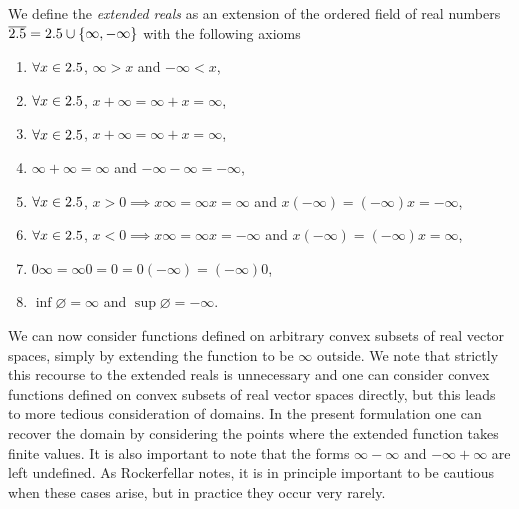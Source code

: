 \begin{defn}\label{defn:extended reals}
  We define the \emph{extended reals} as an extension of the ordered field of real numbers $\overline{2.5} = 2.5 \cup \{\infty, -\infty\}$ with the following axioms
  \begin{enumerate}
    \item $\forall x\in2.5$, $\infty > x$ and $-\infty < x$,
    \item $\forall x\in2.5$, $x + \infty = \infty + x = \infty$,
    \item $\forall x\in2.5$, $x + \infty = \infty + x = \infty$,
    \item $\infty + \infty = \infty$ and $-\infty - \infty = -\infty$,
    \item $\forall x\in2.5$, $x>0 \implies x\infty = \infty x =  \infty$ and $x(-\infty) = (-\infty)x = -\infty$,
    \item $\forall x\in2.5$, $x<0 \implies x\infty = \infty x = -\infty$ and $x(-\infty) = (-\infty)x = \infty$,
    \item $0 \infty = \infty 0 = 0 = 0(-\infty) = (-\infty)0$,
    \item $\inf\varnothing = \infty$ and $\sup\varnothing = -\infty$.
  \end{enumerate}
\end{defn}
We can now consider functions defined on arbitrary convex subsets of real vector spaces, simply by extending the function to be $\infty$ outside. We note that strictly this recourse to the extended reals is unnecessary and one can consider convex functions defined on convex subsets of real vector spaces directly, but this leads to more tedious consideration of domains. In the present formulation one can recover the domain by considering the points where the extended function takes finite values. It is also important to note that the forms $\infty-\infty$ and $-\infty +\infty$ are left undefined. As Rockerfellar notes, it is in principle important to be cautious when these cases arise, but in practice they occur very rarely.

